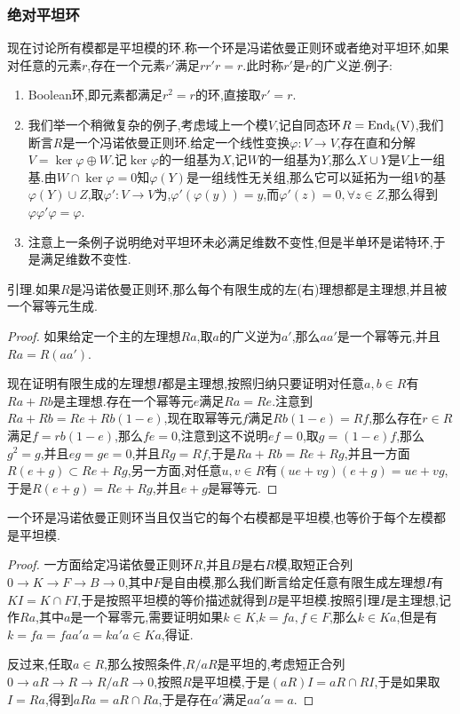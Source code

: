 \subsubsection{绝对平坦环}

现在讨论所有模都是平坦模的环.称一个环是冯诺依曼正则环或者绝对平坦环,如果对任意的元素$r$,存在一个元素$r'$满足$rr'r=r$.此时称$r'$是$r$的广义逆.例子:
\begin{enumerate}
	\item Boolean环,即元素都满足$r^2=r$的环,直接取$r'=r$.
	\item 我们举一个稍微复杂的例子,考虑域上一个模$V$,记自同态环$R=\rm{End}_k(V)$,我们断言$R$是一个冯诺依曼正则环.给定一个线性变换$\varphi:V\to V$,存在直和分解$V=\ker\varphi\oplus W$.记$\ker\varphi$的一组基为$X$,记$W$的一组基为$Y$,那么$X\cup Y$是$V$上一组基.由$W\cap\ker\varphi=0$知$\varphi(Y)$是一组线性无关组,那么它可以延拓为一组$V$的基$\varphi(Y)\cup Z$,取$\varphi':V\to V$为,$\varphi'(\varphi(y))=y$,而$\varphi'(z)=0,\forall z\in Z$,那么得到$\varphi\varphi'\varphi=\varphi$.
	\item 注意上一条例子说明绝对平坦环未必满足维数不变性,但是半单环是诺特环,于是满足维数不变性.
\end{enumerate}

引理.如果$R$是冯诺依曼正则环,那么每个有限生成的左(右)理想都是主理想,并且被一个幂等元生成.
\begin{proof}
	
	如果给定一个主的左理想$Ra$,取$a$的广义逆为$a'$,那么$aa'$是一个幂等元,并且$Ra=R(aa')$.
	
	现在证明有限生成的左理想$I$都是主理想,按照归纳只要证明对任意$a,b\in R$有$Ra+Rb$是主理想.存在一个幂等元$e$满足$Ra=Re$.注意到$Ra+Rb=Re+Rb(1-e)$,现在取幂等元$f$满足$Rb(1-e)=Rf$,那么存在$r\in R$满足$f=rb(1-e)$,那么$fe=0$,注意到这不说明$ef=0$,取$g=(1-e)f$,那么$g^2=g$,并且$eg=ge=0$,并且$Rg=Rf$,于是$Ra+Rb=Re+Rg$,并且一方面$R(e+g)\subset Re+Rg$,另一方面,对任意$u,v\in R$有$(ue+vg)(e+g)=ue+vg$,于是$R(e+g)=Re+Rg$,并且$e+g$是幂等元.
\end{proof}

一个环是冯诺依曼正则环当且仅当它的每个右模都是平坦模,也等价于每个左模都是平坦模.
\begin{proof}
	
	一方面给定冯诺依曼正则环$R$,并且$B$是右$R$模,取短正合列$0\to K\to F\to B\to0$,其中$F$是自由模,那么我们断言给定任意有限生成左理想$I$有$KI=K\cap FI$,于是按照平坦模的等价描述就得到$B$是平坦模.按照引理$I$是主理想,记作$Ra$,其中$a$是一个幂零元,需要证明如果$k\in K$,$k=fa,f\in F$,那么$k\in Ka$,但是有$k=fa=faa'a=ka'a\in Ka$,得证.
	
	反过来,任取$a\in R$,那么按照条件,$R/aR$是平坦的,考虑短正合列$0\to aR\to R\to R/aR\to0$,按照$R$是平坦模,于是$(aR)I=aR\cap RI$,于是如果取$I=Ra$,得到$aRa=aR\cap Ra$,于是存在$a'$满足$aa'a=a$.
\end{proof}


